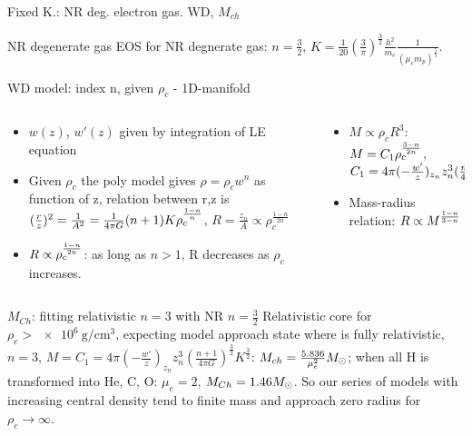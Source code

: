 \begin{frame}{Fixed K.: NR deg. electron gas. WD, $M_{ch}$}
\begin{block}{NR degenerate \Pelectron gas}
    EOS for NR \Pelectron degnerate gas: $n=\frac{3}{2}$, $K=\frac{1}{20}(\frac{3}{\pi})^{\frac{3}{2}}\frac{h^2}{m_e}\frac{1}{(\mu_em_p)^{\frac{5}{3}}}$.
\end{block}
\begin{block}{WD model: index n, given $\rho_c$ - 1D-manifold}
    \begin{columns}[T]
        \begin{column}{0.5\textwidth}
            \begin{itemize}
                \item $w(z)$, $w'(z)$ given by integration of LE equation
                \item Given $\rho_c$ the poly model gives $\rho=\rho_cw^n$ as function of z, relation between r,z is $(\frac{r}{z})^2=\frac{1}{A^2}=\frac{1}{4\pi G}(n+1)K\rho_c^{\frac{1-n}{n}}$, $R=\frac{z_n}{A}\propto\rho_c^{\frac{1-n}{2n}}$
                \item $R\propto\rho_c^{\frac{1-n}{2n}}$: as long as $n>1$, R decreases as $\rho_c$ increases.
            \end{itemize}
        \end{column}
        \begin{column}{0.5\textwidth}
            \begin{itemize}
                \item $M\propto\rho_cR^3$: $M=C_1\rho_c^{\frac{3-n}{2n}}$, $C_1=4\pi(-\frac{w'}{z})_{z_n}z_n^3(\frac{n+1}{4\pi G})^{\frac{3}{2}}K^{\frac{3}{2}}$
                \item Mass-radius relation: $R\propto M^{\frac{1-n}{3-n}}$
            \end{itemize}
        \end{column}
    \end{columns}
\end{block}
\begin{block}{$M_{Ch}$: fitting relativistic $n=3$ with NR $n=\frac{3}{2}$}
    Relativistic core for $\rho_c>\SI{e6}{\gram\per\cubic\cm}$, expecting model approach state where is fully relativistic, $n=3$, $M=C_1=4\pi(-\frac{w'}{z})_{z_n}z_n^3(\frac{n+1}{4\pi G})^{\frac{3}{2}}K^{\frac{3}{2}}$: $M_{ch}=\frac{5.836}{\mu_e^2}M_{\odot}{}$; when all H is transformed into He, C, O: $\mu_e=2$, $M_{Ch}=1.46M_{\odot}{}$. So our series of models with increasing central density tend to finite mass and approach zero radius for $\rho_c\to\infty$.
\end{block}
\end{frame}

